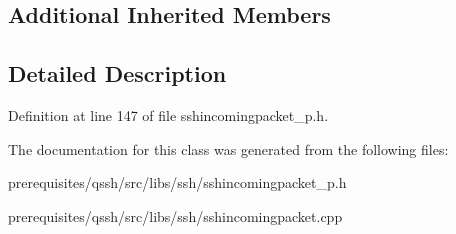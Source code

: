\subsection*{Additional Inherited Members}


\subsection{Detailed Description}


Definition at line 147 of file sshincomingpacket\+\_\+p.\+h.



The documentation for this class was generated from the following files\+:\begin{DoxyCompactItemize}
\item 
prerequisites/qssh/src/libs/ssh/sshincomingpacket\+\_\+p.\+h\item 
prerequisites/qssh/src/libs/ssh/sshincomingpacket.\+cpp\end{DoxyCompactItemize}
